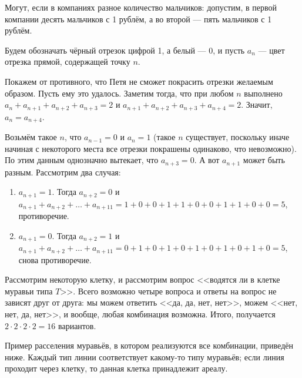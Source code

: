 \begin{itemize}
\itA Могут, если в компаниях разное количество мальчиков: допустим, в первой компании десять мальчиков с 1 рублём, а во второй --- пять мальчиков с 1 рублём.

\itB 

Будем обозначать чёрный отрезок цифрой 1, а белый --- 0, и пусть $a_n$ --- цвет отрезка прямой, содержащей
точку $n$.

Покажем от противного, что Петя не сможет покрасить отрезки желаемым образом.
Пусть ему это удалось.
Заметим тогда, что при любом $n$ выполнено 
$a_n+a_{n+1}+a_{n+2}+a_{n+3} = 2$ и $a_{n+1}+a_{n+2}+a_{n+3}+a_{n+4} = 2$. 
Значит, $a_n = a_{n+4}$. 

Возьмём такое $n$, что $a_{n-1} = 0$ и $a_n = 1$ (такое $n$ существует, поскольку иначе
начиная с некоторого места все отрезки покрашены одинаково, что невозможно). 
По этим данным однозначно вытекает, что $a_{n+3} = 0$. А вот $a_{n+1}$ может быть
разным.
Рассмотрим два случая: 

\begin{enumerate}
\item $a_{n+1} = 1$. Тогда $a_{n+2} = 0$ и
$a_{n+1} + a_{n+2} + \dots + a_{n+11} = 1 + 0 + 0 + 1 + 1 + 0 + 0 + 1 + 1 + 0 + 0 = 5$,
противоречие.

\item $a_{n+1} = 0$. Тогда $a_{n+2} = 1$ и
$a_{n+1} + a_{n+2} + \dots + a_{n+11} = 0 + 1 + 0 + 1 + 0 + 1 + 0 + 1 + 0 + 1 + 0 = 5$,
снова противоречие.
\end{enumerate}

\itC Рассмотрим некоторую клетку, и рассмотрим вопрос <<водятся ли в клетке муравьи типа $T$>>.
Всего возможно четыре вопроса и ответы на вопрос не зависят друг от друга:
мы можем ответить <<да, да, нет, нет>>, можем <<нет, нет, да, нет>>, и вообще, 
любая комбинация возможна. 
Итого, получается $2 \cdot 2 \cdot 2 \cdot 2 = 16$ вариантов. 

Пример расселения муравьёв, в котором реализуются все комбинации, приведён ниже.
Каждый тип линии соответствует какому-то типу муравьёв; если линия проходит
через клетку, то данная клетка принадлежит ареалу.

\begin{center}\end{center}
\end{itemize}
